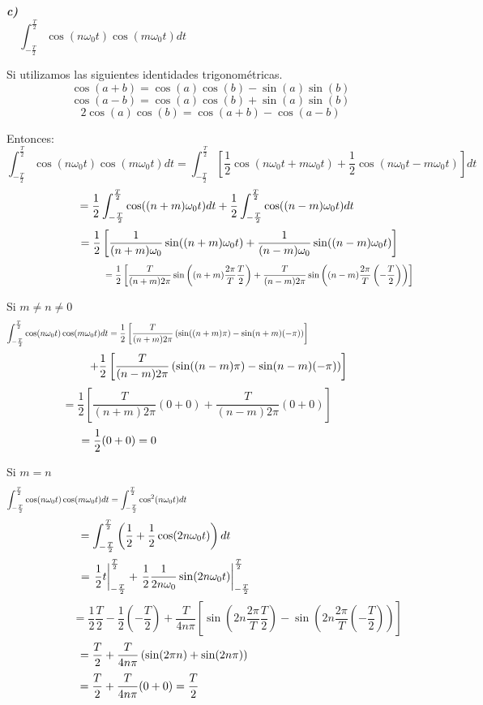\documentclass[a4paper]{article}
\begin{document}
{} \textbf{\textit{c)}}  
\[
\int_{-\frac{T}{2}}^{\frac{T}{2}} \cos(n\omega_{0}t)\cos(m\omega_{0}t)dt 
\hspace{8cm}
\]

{} Si utilizamos las siguientes identidades trigonom\'etricas.  
\[
\cos(a+b)=\cos(a)\cos(b)-\sin(a)\sin(b)
\]
\[
\cos(a-b)=\cos(a)\cos(b)+\sin(a)\sin(b)
\]
\[
2\cos(a)\cos(b)=\cos(a+b)-\cos(a-b)
\]

{} Entonces:  
\[
\int_{-\frac{T}{2}}^{\frac{T}{2}} \cos(n\omega_{0}t)\cos(m\omega_{0}t)dt=
\int_{-\frac{T}{2}}^{\frac{T}{2}} \left[\frac{1}{2}\cos(n\omega_{0}t+m%
\omega_{0}t)+\frac{1}{2}\cos(n\omega_{0}t-m\omega_{0}t)\right]dt \hspace{4cm}
\]
\[
\hspace{0.4cm} = \frac{1}{2}\int_{-\frac{T}{2}}^{\frac{T}{2}%
}\cos((n+m)\omega_{0}t)dt+\frac{1}{2}\int_{-\frac{T}{2}}^{\frac{T}{2}%
}\cos((n-m)\omega_{0}t)dt
\]
\[
\hspace{1.8cm} =\frac{1}{2}\left[\frac{1}{(n+m)\omega_{0}}%
\sin((n+m)\omega_{0}t)+\frac{1}{(n-m)\omega_{0}}\sin((n-m)\omega_{0}t)\right]
\]
\[
\hspace{3.8cm} =\frac{1}{2}\left[\frac{T}{(n+m)2\pi}\sin \left((n+m)\frac{%
2\pi}{T}\frac{T}{2}\right) + \frac{T}{(n-m)2\pi}\sin \left((n-m)\frac{2\pi}{T%
}\left(-\frac{T}{2}\right)\right)\right]
\]

{} Si $m \neq n \neq 0$  
\[
\int_{-\frac{T}{2}}^{\frac{T}{2}} \cos(n\omega_{0}t)\cos(m\omega_{0}t)dt =%
\frac{1}{2}\left[\frac{T}{(n+m)2\pi}\left(\sin((n+m)\pi)-\sin(n+m)(-\pi)
\right)\right] \hspace{4.3cm}
\]
\[
\hspace{0.5cm} +\frac{1}{2}\left[\frac{T}{(n-m)2\pi}\left(\sin((n-m)\pi)-%
\sin(n-m)(-\pi) \right)\right]
\]
\[
=\frac{1}{2}\left[\frac{T}{(n+m)2\pi}(0+0)+\frac{T}{(n-m)2\pi}(0+0)\right] 
\hspace{1cm}
\]
\[
=\frac{1}{2}(0+0)=0 \hspace{5.7cm}
\]

{} Si $m=n$  
\[
\int_{-\frac{T}{2}}^{\frac{T}{2}}
\cos(n\omega_{0}t)\cos(m\omega_{0}t)dt=\int_{-\frac{T}{2}}^{\frac{T}{2}%
}\cos^{2}(n\omega_{0}t)dt \hspace{9.2cm}
\]
\[
=\int_{-\frac{T}{2}}^{\frac{T}{2}}\left(\frac{1}{2}+\frac{1}{2}%
\cos(2n\omega_{0}t)\right)dt \hspace{3.4cm}
\]
\[
= \left.\frac{1}{2}t\right|_{-\frac{T}{2}}^{\frac{T}{2}} + \left.\frac{1}{2}%
\frac{1}{2n\omega_{0}}\sin(2n\omega_{0}t)\right|_{-\frac{T}{2}}^{\frac{T}{2}%
} \hspace{2.8cm}
\]
\[
\hspace{2cm} =\frac{1}{2}\frac{T}{2}-\frac{1}{2}\left(-\frac{T}{2}\right)+%
\frac{T}{4n\pi}\left[\sin\left(2n\frac{2\pi}{T}\frac{T}{2}\right) -
\sin\left(2n\frac{2\pi}{T}\left(-\frac{T}{2}\right)\right) \right]
\]
\[
=\frac{T}{2}+\frac{T}{4n\pi}\left(\sin(2\pi n)+\sin(2n\pi )\right) \hspace{%
2.9cm}
\]
\[
=\frac{T}{2}+\frac{T}{4n\pi}(0+0)=\frac{T}{2} \hspace{4.4cm}
\]
\end{document}
